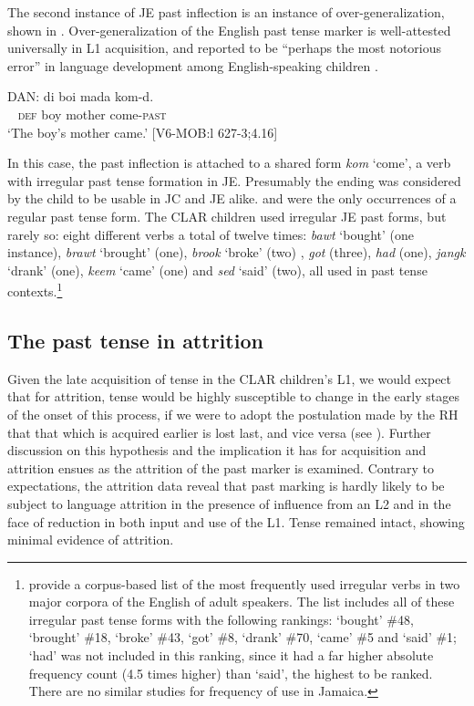 \documentclass[output=paper,colorlinks,citecolor=brown]{langscibook}
\begin{document}
\begin{sloppypar}
The second instance of JE past inflection is an instance of over-generalization, shown in . Over-generalization of the English past tense marker is well-attested universally in L1 acquisition, and reported to be “perhaps the most notorious error” in language development among English-speaking children \citep[81]{Marcus1996}.
\end{sloppypar}

\ea \label{bkm:messamK:15}
\gll   DAN:   di    boi  mada    kom-d. \\
  ~ \textsc{def} boy mother  come-\textsc{past}\\
\glt \hphantom{DAN:} `The boy’s mother came.’           [V6-MOB:l 627-3;4.16]
\z



In this case, the past inflection is attached to a shared form \textit{kom} ‘come’, a verb with irregular past tense formation in JE. Presumably the ending was considered by the child to be usable in JC and JE alike.  and  were the only occurrences of a regular past tense form. The CLAR children used irregular JE past forms, but rarely so: eight different verbs a total of twelve times: \textit{bawt} ‘bought’ (one instance), \textit{brawt} ‘brought’ (one), \textit{brook} ‘broke’ (two) , \textit{got}  (three), \textit{had} (one), \textit{jangk} ‘drank’ (one), \textit{keem} ‘came’ (one) and \textit{sed} ‘said’ (two), all used in past tense contexts.\footnote{\citet{GrabowskiMindt1995} provide a corpus-based list of the most frequently used irregular verbs in two major corpora of the English of adult speakers. The list includes all of these irregular past tense forms with the following rankings: ‘bought’ \#48, ‘brought’ \#18, ‘broke’ \#43, ‘got’ \#8, ‘drank’ \#70, ‘came’ \#5 and ‘said’ \#1; ‘had’ was not included in this ranking, since it had a far higher absolute frequency count (4.5 times higher) than ‘said’, the highest to be ranked. There are no similar studies for frequency of use in Jamaica.}

\subsection{The past tense in attrition} \label{sec:messamk:4.4}

Given the late acquisition of tense in the CLAR children’s L1, we would expect that for attrition, tense would be highly susceptible to change in the early stages of the onset of this process, if we were to adopt the postulation made by the RH that that which is acquired earlier is lost last, and vice versa (see \citealt[16]{KöpkeSchmid2004}). Further discussion on this hypothesis and the implication it has for acquisition and attrition ensues as the attrition of the past marker is examined. Contrary to expectations, the attrition data reveal that past marking is hardly likely to be subject to language attrition in the presence of influence from an L2 and in the face of reduction in both input and use of the L1. Tense remained intact, showing minimal evidence of attrition.
\end{document}
